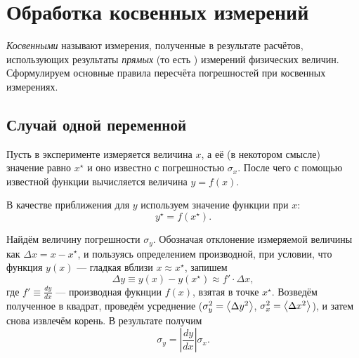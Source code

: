 \section{Обработка косвенных измерений\label{sec:kosv}}

\emph{Косвенными} называют измерения, полученные в результате расчётов,
использующих результаты \emph{прямых} (то есть )
измерений физических величин. Сформулируем основные правила пересчёта
погрешностей при косвенных измерениях.

\subsection{Случай одной переменной}

Пусть в эксперименте измеряется величина $x$, а её 
(в некотором смысле) значение равно $x^{\star}$ и оно известно с
погрешностью $\sigma_{x}$. После чего с помощью известной функции
вычисляется величина $y=f\!\left(x\right)$.

В качестве  приближения для $y$ используем значение функции
при  $x$:
\[
y^{\star}=f\!\left(x^{\star}\right).
\]

Найдём величину погрешности $\sigma_{y}$. Обозначая отклонение измеряемой
величины как $\Delta x=x-x^{\star}$, и пользуясь определением производной,
при условии, что функция $y\left(x\right)$ --- гладкая
вблизи $x\approx x^{\star}$, запишем
\[
\Delta y\equiv y\left(x\right)-y\left(x^{\star}\right)\approx f'\cdot\Delta x,
\]
где $f'\equiv\frac{dy}{dx}$ --- производная фукнции $f(x)$, взятая в точке
$x^{\star}$. Возведём полученное в квадрат, проведём усреднение
($\sigma_{y}^{2}=\left<\Delta y^{2}\right>$,
$\sigma_{x}^{2}=\left<\Delta x^{2}\right>$), и затем снова извлечём
корень. В результате получим
\begin{equation}
{\sigma_{y}=\left|\frac{dy}{dx}\right|\sigma_{x}.}\label{eq:sxy}
\end{equation}




